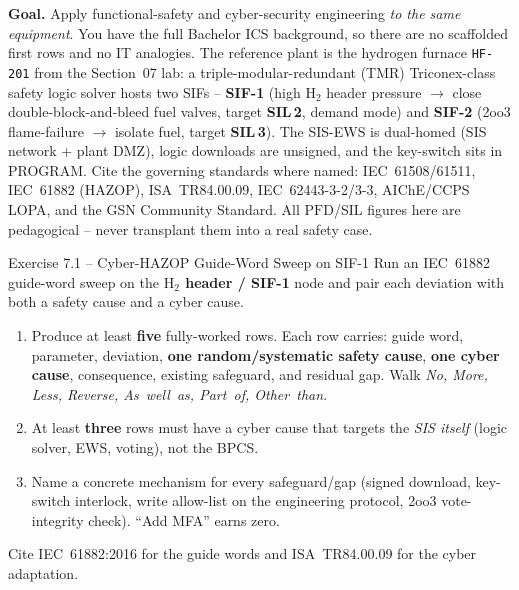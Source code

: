 \documentclass[11pt,a4paper]{article}
\begin{document}
\sheetheader

\noindent\textbf{Goal.} Apply functional-safety and cyber-security engineering
\emph{to the same equipment}. You have the full Bachelor ICS background, so
there are no scaffolded first rows and no IT analogies. The reference plant is
the hydrogen furnace \texttt{HF-201} from the Section~07 lab: a
triple-modular-redundant (TMR) Triconex-class safety logic solver hosts two
SIFs --
\textbf{SIF-1} (high $\mathrm{H_2}$ header pressure $\to$ close
double-block-and-bleed fuel valves, target \textbf{SIL\,2}, demand mode) and
\textbf{SIF-2} (2oo3 flame-failure $\to$ isolate fuel, target \textbf{SIL\,3}).
The SIS-EWS is dual-homed (SIS network + plant DMZ), logic downloads are
unsigned, and the key-switch sits in PROGRAM. Cite the governing standards
where named: IEC~61508/61511, IEC~61882 (HAZOP), ISA~TR84.00.09,
IEC~62443-3-2/3-3, AIChE/CCPS LOPA, and the GSN Community Standard. All
$\mathrm{PFD}$/SIL figures here are pedagogical -- never transplant them into a
real safety case.

\vspace{0.6em}

\begin{taskbox}{Exercise 7.1 -- Cyber-HAZOP Guide-Word Sweep on SIF-1}
Run an IEC~61882 guide-word sweep on the \textbf{$\mathrm{H_2}$ header / SIF-1}
node and pair each deviation with both a safety cause and a cyber cause.
\begin{enumerate}\setlength{\itemsep}{1pt}
  \item Produce at least \textbf{five} fully-worked rows. Each row carries:
        guide word, parameter, deviation, \textbf{one random/systematic safety
        cause}, \textbf{one cyber cause}, consequence, existing safeguard, and
        residual gap. Walk \emph{No, More, Less, Reverse, As~well~as,
        Part~of, Other~than}.
  \item At least \textbf{three} rows must have a cyber cause that targets the
        \emph{SIS itself} (logic solver, EWS, voting), not the BPCS.
  \item Name a concrete mechanism for every safeguard/gap (signed download,
        key-switch interlock, write allow-list on the engineering protocol,
        2oo3 vote-integrity check). ``Add MFA'' earns zero.
\end{enumerate}
Cite IEC~61882:2016 for the guide words and ISA~TR84.00.09 for the cyber
adaptation.
\end{taskbox}
\end{document}
